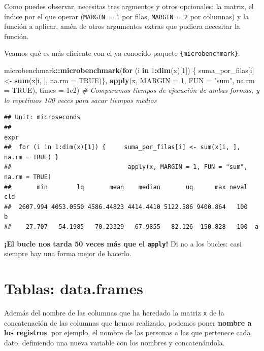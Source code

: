 \documentclass[11pt,]{book}
\newenvironment{Shaded}{\begin{snugshade}}{\end{snugshade}}
\newcommand{\CommentTok}[1]{\textcolor[rgb]{0.37,0.37,0.37}{\textit{#1}}}
\newcommand{\ControlFlowTok}[1]{\textcolor[rgb]{0.27,0.27,0.27}{\textbf{#1}}}
\newcommand{\DataTypeTok}[1]{\textcolor[rgb]{0.27,0.27,0.27}{#1}}
\newcommand{\DecValTok}[1]{\textcolor[rgb]{0.06,0.06,0.06}{#1}}
\newcommand{\FloatTok}[1]{\textcolor[rgb]{0.06,0.06,0.06}{#1}}
\newcommand{\KeywordTok}[1]{\textcolor[rgb]{0.27,0.27,0.27}{\textbf{#1}}}
\newcommand{\NormalTok}[1]{#1}
\newcommand{\OperatorTok}[1]{\textcolor[rgb]{0.43,0.43,0.43}{\textbf{#1}}}
\newcommand{\OtherTok}[1]{\textcolor[rgb]{0.37,0.37,0.37}{#1}}
\newcommand{\StringTok}[1]{\textcolor[rgb]{0.5,0.5,0.5}{#1}}
\begin{document}
Como puedes observar, necesitas tres argmentos y otros opcionales: la matriz, el índice por el que operar (\texttt{MARGIN\ =\ 1} por filas, \texttt{MARGIN\ =\ 2} por columnas) y la función a aplicar, amén de otros argumentos extras que pudiera necesitar la función.

Veamos qué es más eficiente con el ya conocido paquete \texttt{\{microbenchmark\}}.

\begin{Shaded}
\begin{Highlighting}[]
\NormalTok{microbenchmark}\OperatorTok{::}\KeywordTok{microbenchmark}\NormalTok{(}\ControlFlowTok{for}\NormalTok{ (i }\ControlFlowTok{in} \DecValTok{1}\OperatorTok{:}\KeywordTok{dim}\NormalTok{(x)[}\DecValTok{1}\NormalTok{]) \{}
\NormalTok{  suma_por_filas[i] <-}\StringTok{ }\KeywordTok{sum}\NormalTok{(x[i, ], }\DataTypeTok{na.rm =} \OtherTok{TRUE}\NormalTok{)\}, }\KeywordTok{apply}\NormalTok{(x, }\DataTypeTok{MARGIN =} \DecValTok{1}\NormalTok{, }\DataTypeTok{FUN =} \StringTok{"sum"}\NormalTok{, }\DataTypeTok{na.rm =} \OtherTok{TRUE}\NormalTok{), }\DataTypeTok{times =} \FloatTok{1e2}\NormalTok{) }\CommentTok{# Comparamos tiempos de ejecución de ambas formas, y lo repetimos 100 veces para sacar tiempos medios}
\end{Highlighting}
\end{Shaded}

\begin{verbatim}
## Unit: microseconds
##                                                                           expr
##  for (i in 1:dim(x)[1]) {     suma_por_filas[i] <- sum(x[i, ], na.rm = TRUE) }
##                                apply(x, MARGIN = 1, FUN = "sum", na.rm = TRUE)
##       min        lq       mean    median       uq      max neval cld
##  2607.994 4053.0550 4586.44823 4414.4410 5122.586 9400.864   100   b
##    27.707   54.1985   70.23329   67.9855   82.126  150.828   100  a
\end{verbatim}

\textbf{¡El bucle nos tarda 50 veces más que el \texttt{apply}!} Di no a los bucles: casi siempre hay una forma mejor de hacerlo.

\hypertarget{tablas-data.frames}{%
\section{Tablas: data.frames}\label{tablas-data.frames}}

Además del nombre de las columnas que ha heredado la matriz \texttt{x} de la concatenación de las columnas que hemos realizado, podemos poner \textbf{nombre a los registros}, por ejemplo, el nombre de las personas a las que pertenece cada dato, definiendo una nueva variable con los nombres y concatenándola.
\end{document}
